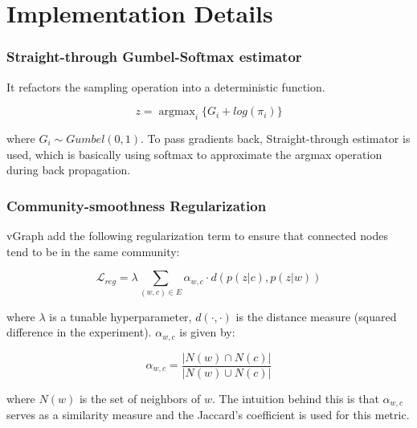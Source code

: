 \documentclass[12pt,aspectratio=169]{beamer}
\begin{document}

    \section{Implementation Details}

    \begin{frame}
        \frametitle{Straight-through Gumbel-Softmax estimator}

        It refactors the sampling operation into a deterministic function.

        $$ z = \mathop{argmax}_i\{{G_i + log(\pi_i)}\} $$
        
        where $G_i \sim Gumbel(0, 1)$. To pass gradients back, Straight-through estimator is used, which is basically using
        softmax to approximate the argmax operation during back propagation.
    \end{frame}

    \begin{frame}
        \frametitle{Community-smoothness Regularization}

        vGraph add the following regularization term to ensure that connected nodes tend to be in the same community:

        $$ \mathcal{L}_{reg} = \lambda\sum_{(w,c)\in E}\alpha_{w,c}\cdot d(p(z|c),p(z|w)) $$
    
        where $\lambda$ is a tunable hyperparameter, $d(\cdot,\cdot)$ is the distance measure (squared difference in the
        experiment). $\alpha_{w,c}$ is given by:

        $$ \alpha_{w,c} = \frac{\vert N(w) \cap N(c)\vert}{\vert N(w) \cup N(c)\vert} $$

        where $N(w)$ is the set of neighbors of $w$. The intuition behind this is that $\alpha_{w,c}$ serves as a
        similarity measure and the Jaccard's coefficient is used for this metric.
    \end{frame}
\end{document}

